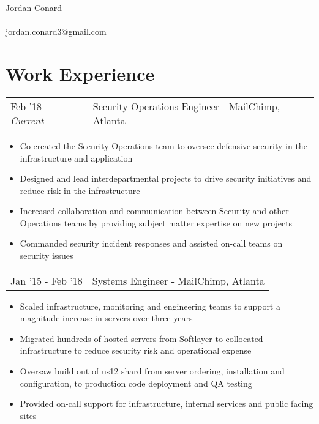 \documentclass[letterpaper]{article}
\begin{document}
\pagestyle{empty} %


\begin{center}
    {\Huge Jordan Conard}\\~\\
    jordan.conard3@gmail.com\\
\end{center}

\section*{Work Experience}
\begin{tabular}{l|l}
{Feb '18 - \emph{Current}} & Security Operations Engineer - MailChimp, Atlanta
\end{tabular}
\begin{itemize}[noitemsep]
	\item Co-created the Security Operations team to oversee defensive security in the infrastructure and application
	\item Designed and lead interdepartmental projects to drive security initiatives and reduce risk in the infrastructure
	\item Increased collaboration and communication between Security and other Operations teams by providing subject matter expertise on new projects
	\item Commanded security incident responses and assisted on-call teams on security issues
\end{itemize}
\begin{tabular}{l|l}
{Jan '15 - Feb '18} & Systems Engineer - MailChimp, Atlanta\\
\end{tabular}
\begin{itemize}[noitemsep]
	\item Scaled infrastructure, monitoring and engineering teams to support a magnitude increase in servers over three years
	\item Migrated hundreds of hosted servers from Softlayer to collocated infrastructure to reduce security risk and operational expense
	\item Oversaw build out of us12 shard from server ordering, installation and configuration, to production code deployment and QA testing
	\item Provided on-call support for infrastructure, internal services and public facing sites
\end{itemize}
\end{document}

